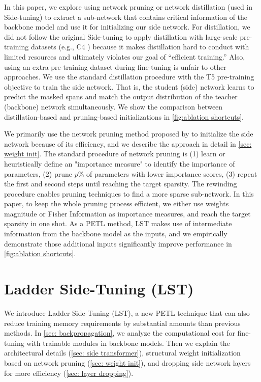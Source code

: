 In this paper, we explore using network pruning or network distillation \cite{Hinton2015Distilling} (used in Side-tuning) to extract a sub-network that contains critical information of the backbone model and use it for initializing our side network. For distillation, we did not follow the original Side-tuning to apply distillation with large-scale pre-training datasets (e.g., C4 \cite{raffel2020exploring}) because it makes distillation hard to conduct with limited resources and ultimately violates our goal of ``efficient training.'' Also, using an extra pre-training dataset during fine-tuning is unfair to other approaches. We use the standard distillation procedure with the T5 \cite{raffel2020exploring} pre-training objective to train the side network. That is, the student (side) network learns to predict the masked spans and match the output distribution of the teacher (backbone) network simultaneously. We show the comparison between distillation-based and pruning-based initializations in \ref{fig:ablation shortcuts}.

We primarily use the network pruning method proposed by \citet{Li2017PruningFF} to initialize the side network because of its efficiency, and we describe the approach in detail in \ref{sec: weight init}. The standard procedure of network pruning is (1) learn \cite{Frankle2019TheLT,Frankle2020LinearMC} or heuristically define \cite{Li2017PruningFF} an "importance measure" to identify the importance of parameters, (2) prune $p\%$ of parameters with lower importance scores, (3) repeat the first and second steps until reaching the target sparsity. The rewinding procedure enables pruning techniques to find a more sparse sub-network. In this paper, to keep the whole pruning process efficient, we either use weights magnitude \cite{Li2017PruningFF} or Fisher Information \cite{sung2021training,Liu2021GroupFP} as importance measures, and reach the target sparsity in one shot. As a PETL method, LST makes use of intermediate information from the backbone model as the inputs, and we empirically demonstrate those additional inputs significantly improve performance in \ref{fig:ablation shortcuts}.

\section{Ladder Side-Tuning (LST)}
\label{sec: ladder_side_tuning}

We introduce Ladder Side-Tuning (LST), a new PETL technique that can also reduce training memory requirements by substantial amounts than previous methods. In \ref{sec: backpropagation}, we analyze the computational cost for fine-tuning with trainable modules in backbone models. Then we explain the architectural details (\ref{sec: side transformer}), structural weight initialization based on network pruning (\ref{sec: weight init}), and dropping side network layers for more efficiency  (\ref{sec: layer dropping}).

